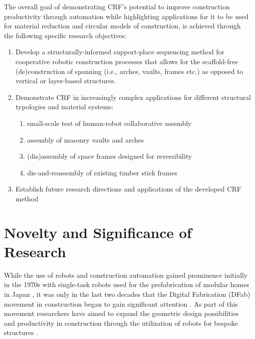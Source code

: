     The overall goal of demonstrating CRF's potential to improve construction productivity through automation while highlighting applications for it to be used for material reduction and circular models of construction, is achieved through the following specific research objectives:
    
    \begin{enumerate}
        \item Develop a structurally-informed support-place sequencing method for cooperative robotic construction processes that allows for the scaffold-free (de)construction of spanning (i.e., arches, vaults, frames etc.) as opposed to vertical or layer-based structures.
        \item Demonstrate CRF in increasingly complex applications for different structural typologies and material systems:
            \begin{enumerate}
                \item small-scale test of human-robot collaborative assembly
                \item assembly of masonry vaults and arches
                \item (dis)assembly of space frames designed for reversibility
                \item dis-and-reassembly of existing timber stick frames
            \end{enumerate}
        \item Establish future research directions and applications of the developed CRF method
    \end{enumerate}



\section{Novelty and Significance of Research}
    While the use of robots and construction automation gained prominence initially in the 1970s with single-task robots used for the prefabrication of modular homes in Japan \citep{bock_construction_2007, bock_future_2015, bock_construction_2016, albus_trip_1986}, it was only in the last two decades that the Digital Fabrication (DFab) movement in construction began to gain significant attention \citep{gramazio_digital_2008}. As part of this movement researchers have aimed to expand the geometric design possibilities and productivity in construction through the utilization of robots for bespoke structures \citep{gramazio_made_2014, davila_delgado_robotics_2019}.
    
